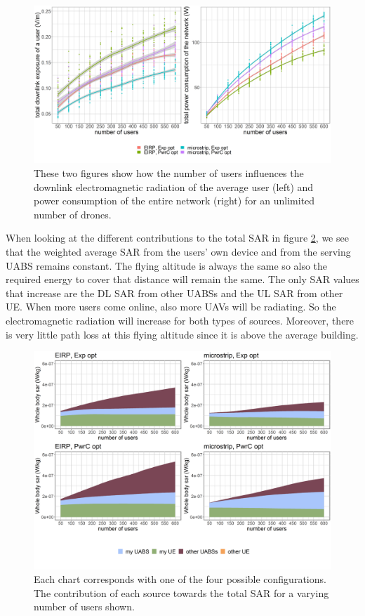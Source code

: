 \documentclass[twocolumn]{phdsymp} %
\begin{document}
\begin{figure}[h!]
  \includegraphics[width=\linewidth]{../results/s3/uvsdlAndPc.png}
  \caption{These two figures show how the number of users influences the downlink electromagnetic radiation of the average user (left) and 
  power consumption of the entire network (right) for an unlimited number of drones.}
  \label{fig:s3b_dlAndPC}
\end{figure}

When looking at the different contributions to the total \gls{SAR} in figure \ref{fig:s3b_fourSourcesMatrix}, 
we see that the weighted average 
\gls{SAR} from the users' own device and from the serving \gls{UABS} remains constant. The flying altitude is always the same so 
also the required energy to cover that distance will remain the same. 
The only \gls{SAR} values that increase are the \gls{DL} \gls{SAR} from other \gls{UABS}s and the \gls{UL} \gls{SAR} 
from other \gls{UE}. 
When more users come online, also more \gls{UAV}s will be radiating. So the electromagnetic
radiation will increase for both types of sources. Moreover, there is very little path loss at this flying altitude since it 
is above the average building.

\begin{figure}[h!]
  \includegraphics[width=\linewidth]{../results/s3/uFourSources.png}
  \caption{Each chart corresponds with one of the four possible configurations. The contribution of each source towards the total 
  \gls{SAR} for a varying number of users shown.}
  \label{fig:s3b_fourSourcesMatrix}
\end{figure}
\end{document}
